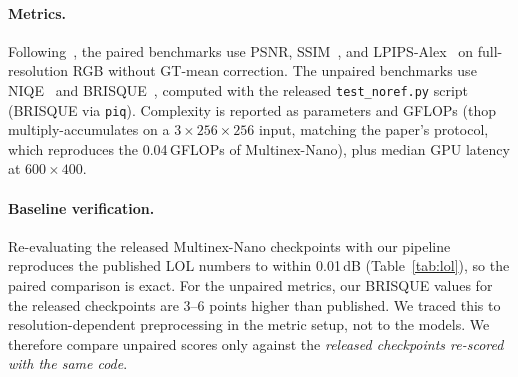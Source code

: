 \documentclass[10pt,twocolumn,letterpaper]{article}
\begin{document}
\paragraph{Metrics.}
Following~\cite{brateanu2026multinex}, the paired benchmarks use PSNR,
SSIM~\cite{wang2004ssim}, and LPIPS-Alex~\cite{zhang2018lpips} on full-resolution
RGB without GT-mean correction. The unpaired benchmarks use
NIQE~\cite{mittal2013niqe} and BRISQUE~\cite{mittal2012brisque}, computed with the
released \texttt{test\_noref.py} script (BRISQUE via \texttt{piq}). Complexity is
reported as parameters and GFLOPs (thop multiply-accumulates on a
$3{\times}256{\times}256$ input, matching the paper's protocol, which reproduces
the 0.04\,GFLOPs of Multinex-Nano), plus median GPU latency at $600{\times}400$.

\paragraph{Baseline verification.}
Re-evaluating the released Multinex-Nano checkpoints with our pipeline reproduces
the published LOL numbers to within 0.01\,dB (Table~\ref{tab:lol}), so the
paired comparison is exact. For the unpaired metrics, our BRISQUE values for
the released checkpoints are 3--6 points higher than published. We traced this to
resolution-dependent preprocessing in the metric setup, not to the models.
We therefore compare unpaired scores only against the \emph{released checkpoints
re-scored with the same code}.
\end{document}
